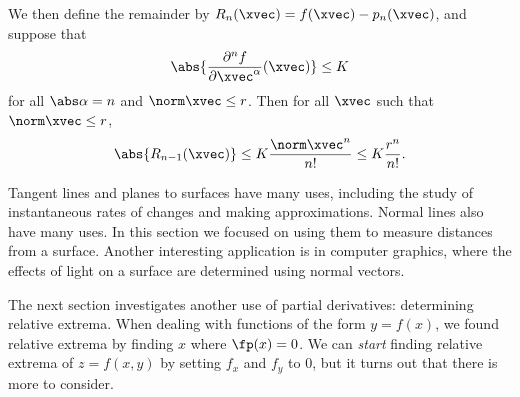 We then define the remainder by $R_n(\xvec)=f(\xvec)-p_n(\xvec)$, and suppose that
\[\abs{\dfrac{\partial^n f}{\partial\xvec^\alpha}(\xvec)}\le K\]
for all $\abs\alpha=n$ and $\norm\xvec\le r$.  Then for all $\xvec$ such that $\norm\xvec\le r$,
\[\abs{R_{n-1}(\xvec)}\le K\frac{\norm\xvec^n}{n!}\le K\frac{r^n}{n!}.\]

\fi
\bigskip\bigskip

Tangent lines and planes to surfaces have many uses, including the study of instantaneous rates of changes and making approximations. Normal lines also have many uses. In this section we focused on using them to measure distances from a surface. Another interesting application is in computer graphics, where the effects of light on a surface are determined using normal vectors.\bigskip

The next section investigates another use of partial derivatives: determining relative extrema. When dealing with functions of the form $y=f(x)$, we found relative extrema  by finding $x$ where $\fp(x) = 0$. We can \emph{start} finding relative extrema of $z=f(x,y)$ by setting $f_x$ and $f_y$ to 0, but it turns out that there is more to consider.

